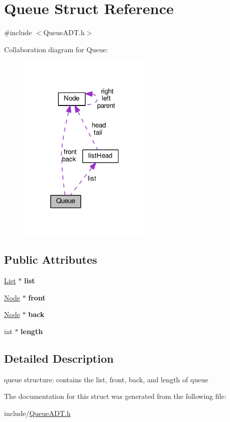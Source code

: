 \hypertarget{structQueue}{}\section{Queue Struct Reference}
\label{structQueue}


{\ttfamily \#include $<$Queue\+A\+D\+T.\+h$>$}



Collaboration diagram for Queue\+:
\nopagebreak
\begin{figure}[H]
\begin{center}
\leavevmode
\includegraphics[width=181pt]{structQueue__coll__graph}
\end{center}
\end{figure}
\subsection*{Public Attributes}
\begin{DoxyCompactItemize}
\item 
\mbox{\label{structQueue_a41c7eb433a01719af10cd2dc998ebdd8}} 
\hyperlink{LinkedListAPI_8h_a87906180aa2c50677fa64f2f44a25bf0}{List} $\ast$ {\bfseries list}
\item 
\mbox{\label{structQueue_a36ab375d24d41bcc1d598c132700835b}} 
\hyperlink{structNode}{Node} $\ast$ {\bfseries front}
\item 
\mbox{\label{structQueue_aaf188b8da9524a67e909f14d78563dab}} 
\hyperlink{structNode}{Node} $\ast$ {\bfseries back}
\item 
\mbox{\label{structQueue_a3c0430ed080b9095895b73241ef859ac}} 
int $\ast$ {\bfseries length}
\end{DoxyCompactItemize}


\subsection{Detailed Description}
queue structure\+: contains the list, front, back, and length of queue 

The documentation for this struct was generated from the following file\+:\begin{DoxyCompactItemize}
\item 
include/\hyperlink{QueueADT_8h}{Queue\+A\+D\+T.\+h}\end{DoxyCompactItemize}
